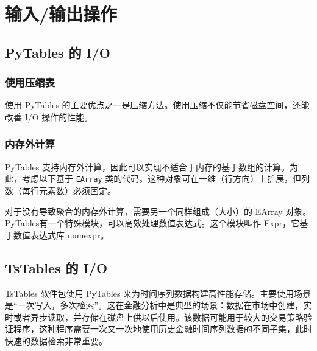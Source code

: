 \chapter{输入/输出操作\label{Ch09}}
\section{PyTables 的 I/O}
\subsection{使用压缩表}
使用 PyTables 的主要优点之一是压缩方法。使用压缩不仅能节省磁盘空间，还能改善 I/O 操作的性能。
\subsection{内存外计算}
PyTables 支持内存外计算，因此可以实现不适合于内存的基于数组的计算。为此，考虑以下基于 \verb|EArray| 类的代码。这种对象可在一维（行方向）上扩展，但列数（每行元素数）必须固定。

对于没有导致聚合的内存外计算，需要另一个同样组成（大小）的 EArray 对象。PyTables有一个特殊模块，可以高效处理数值表达式。这个模块叫作 Expr，它基于数值表达式库 numexpr。

\section{TsTables 的 I/O}
TsTables 软件包使用 PyTables 来为时间序列数据构建高性能存储。主要使用场景是“一次写入，多次检索”。这在金融分析中是典型的场景：数据在市场中创建，实时或者异步读取，并存储在磁盘上供以后使用。该数据可能用于较大的交易策略验证程序，这种程序需要一次又一次地使用历史金融时间序列数据的不同子集，此时快速的数据检索非常重要。

